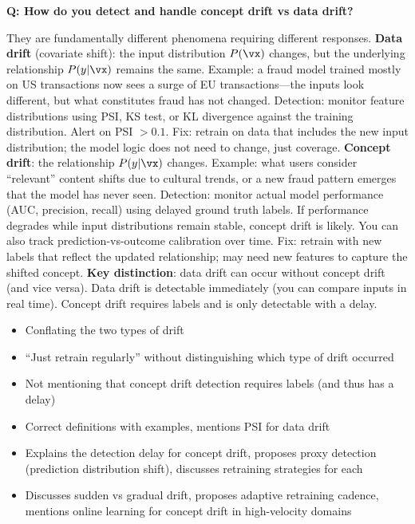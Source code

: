 \begin{interviewq}
\textbf{Q: How do you detect and handle concept drift vs data drift?}

 \quad {} \quad \badgefreq{\freqmed}

\stronganswer They are fundamentally different phenomena requiring different responses. \textbf{Data drift} (covariate shift): the input distribution $P(\vx)$ changes, but the underlying relationship $P(y|\vx)$ remains the same. Example: a fraud model trained mostly on US transactions now sees a surge of EU transactions---the inputs look different, but what constitutes fraud has not changed. Detection: monitor feature distributions using PSI, KS test, or KL divergence against the training distribution. Alert on PSI $> 0.1$. Fix: retrain on data that includes the new input distribution; the model logic does not need to change, just coverage. \textbf{Concept drift}: the relationship $P(y|\vx)$ changes. Example: what users consider ``relevant'' content shifts due to cultural trends, or a new fraud pattern emerges that the model has never seen. Detection: monitor actual model performance (AUC, precision, recall) using delayed ground truth labels. If performance degrades while input distributions remain stable, concept drift is likely. You can also track prediction-vs-outcome calibration over time. Fix: retrain with new labels that reflect the updated relationship; may need new features to capture the shifted concept. \textbf{Key distinction}: data drift can occur without concept drift (and vice versa). Data drift is detectable immediately (you can compare inputs in real time). Concept drift requires labels and is only detectable with a delay.

\redflags
\begin{itemize}
    \item Conflating the two types of drift
    \item ``Just retrain regularly'' without distinguishing which type of drift occurred
    \item Not mentioning that concept drift detection requires labels (and thus has a delay)
\end{itemize}


\goodgreat
\begin{itemize}
    \item {} Correct definitions with examples, mentions PSI for data drift
    \item {} Explains the detection delay for concept drift, proposes proxy detection (prediction distribution shift), discusses retraining strategies for each
    \item {} Discusses sudden vs gradual drift, proposes adaptive retraining cadence, mentions online learning for concept drift in high-velocity domains
\end{itemize}


\end{interviewq}
